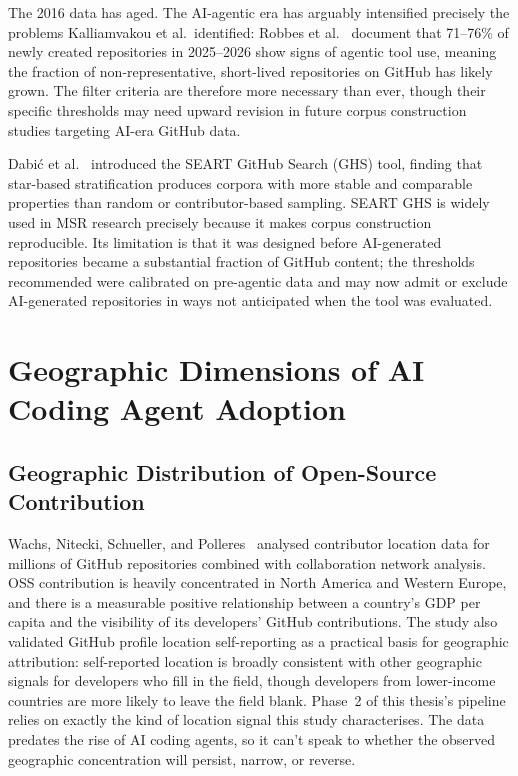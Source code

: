 The 2016 data has aged. The AI-agentic era has arguably intensified precisely the problems Kalliamvakou et al.\ identified: Robbes et al.~\cite{robbesAgenticVery2026} document that 71--76\% of newly created repositories in 2025--2026 show signs of agentic tool use, meaning the fraction of non-representative, short-lived repositories on GitHub has likely grown. The filter criteria are therefore more necessary than ever, though their specific thresholds may need upward revision in future corpus construction studies targeting AI-era GitHub data.

Dabi\'c et al.~\cite{dabic2021} introduced the SEART GitHub Search (GHS) tool, finding that star-based stratification produces corpora with more stable and comparable properties than random or contributor-based sampling. SEART GHS is widely used in MSR research precisely because it makes corpus construction reproducible. Its limitation is that it was designed before AI-generated repositories became a substantial fraction of GitHub content; the thresholds recommended were calibrated on pre-agentic data and may now admit or exclude AI-generated repositories in ways not anticipated when the tool was evaluated.

\section{Geographic Dimensions of AI Coding Agent Adoption}
\label{sec:lr:geography}

\subsection{Geographic Distribution of Open-Source Contribution}

Wachs, Nitecki, Schueller, and Polleres~\cite{wachs2022} analysed contributor location data for millions of GitHub repositories combined with collaboration network analysis. OSS contribution is heavily concentrated in North America and Western Europe, and there is a measurable positive relationship between a country's GDP per capita and the visibility of its developers' GitHub contributions. The study also validated GitHub profile location self-reporting as a practical basis for geographic attribution: self-reported location is broadly consistent with other geographic signals for developers who fill in the field, though developers from lower-income countries are more likely to leave the field blank. Phase~2 of this thesis's pipeline relies on exactly the kind of location signal this study characterises. The data predates the rise of AI coding agents, so it can't speak to whether the observed geographic concentration will persist, narrow, or reverse.

